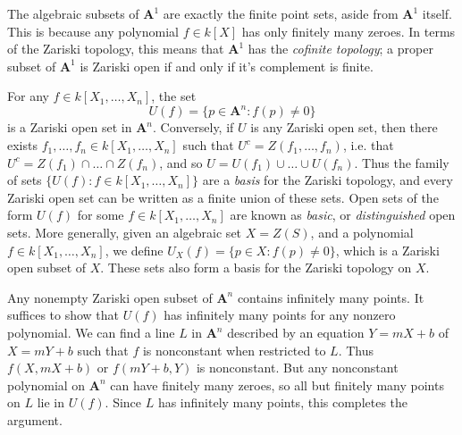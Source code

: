 \begin{example}
    The algebraic subsets of $\mathbf{A}^1$ are exactly the finite point sets, aside from $\mathbf{A}^1$ itself. This is because any polynomial $f \in k[X]$ has only finitely many zeroes. In terms of the Zariski topology, this means that $\mathbf{A}^1$ has the \emph{cofinite topology}; a proper subset of $\mathbf{A}^1$ is Zariski open if and only if it's complement is finite.
\end{example}

For any $f \in k[X_1,\dots,X_n]$, the set
%
\[ U(f) = \{ p \in \mathbf{A}^n: f(p) \neq 0 \} \]
%
is a Zariski open set in $\mathbf{A}^n$. Conversely, if $U$ is any Zariski open set, then there exists $f_1,\dots,f_n \in k[X_1,\dots,X_n]$ such that $U^c = Z(f_1,\dots,f_n)$, i.e. that $U^c = Z(f_1) \cap \dots \cap Z(f_n)$, and so $U = U(f_1) \cup \dots \cup U(f_n)$. Thus the family of sets $\{ U(f): f \in k[X_1,\dots,X_n] \}$ are a \emph{basis} for the Zariski topology, and every Zariski open set can be written as a finite union of these sets. Open sets of the form $U(f)$ for some $f \in k[X_1,\dots,X_n]$ are known as \emph{basic}, or \emph{distinguished} open sets. More generally, given an algebraic set $X = Z(S)$, and a polynomial $f \in k[X_1,\dots,X_n]$, we define $U_X(f) = \{ p \in X : f(p) \neq 0 \}$, which is a Zariski open subset of $X$. These sets also form a basis for the Zariski topology on $X$.

\begin{example}
    Any nonempty Zariski open subset of $\mathbf{A}^n$ contains infinitely many points. It suffices to show that $U(f)$ has infinitely many points for any nonzero polynomial. We can find a line $L$ in $\mathbf{A}^n$ described by an equation $Y = mX + b$ of $X = mY + b$ such that $f$ is nonconstant when restricted to $L$. Thus $f(X,mX + b)$ or $f(mY + b,Y)$ is nonconstant. But any nonconstant polynomial on $\mathbf{A}^n$ can have finitely many zeroes, so all but finitely many points on $L$ lie in $U(f)$. Since $L$ has infinitely many points, this completes the argument.
\end{example}

